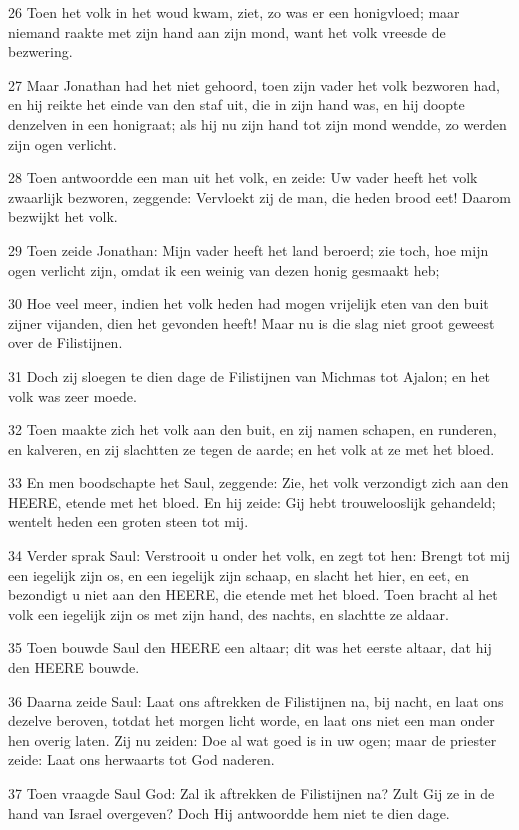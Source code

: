 \par 26 Toen het volk in het woud kwam, ziet, zo was er een honigvloed; maar niemand raakte met zijn hand aan zijn mond, want het volk vreesde de bezwering.
\par 27 Maar Jonathan had het niet gehoord, toen zijn vader het volk bezworen had, en hij reikte het einde van den staf uit, die in zijn hand was, en hij doopte denzelven in een honigraat; als hij nu zijn hand tot zijn mond wendde, zo werden zijn ogen verlicht.
\par 28 Toen antwoordde een man uit het volk, en zeide: Uw vader heeft het volk zwaarlijk bezworen, zeggende: Vervloekt zij de man, die heden brood eet! Daarom bezwijkt het volk.
\par 29 Toen zeide Jonathan: Mijn vader heeft het land beroerd; zie toch, hoe mijn ogen verlicht zijn, omdat ik een weinig van dezen honig gesmaakt heb;
\par 30 Hoe veel meer, indien het volk heden had mogen vrijelijk eten van den buit zijner vijanden, dien het gevonden heeft! Maar nu is die slag niet groot geweest over de Filistijnen.
\par 31 Doch zij sloegen te dien dage de Filistijnen van Michmas tot Ajalon; en het volk was zeer moede.
\par 32 Toen maakte zich het volk aan den buit, en zij namen schapen, en runderen, en kalveren, en zij slachtten ze tegen de aarde; en het volk at ze met het bloed.
\par 33 En men boodschapte het Saul, zeggende: Zie, het volk verzondigt zich aan den HEERE, etende met het bloed. En hij zeide: Gij hebt trouwelooslijk gehandeld; wentelt heden een groten steen tot mij.
\par 34 Verder sprak Saul: Verstrooit u onder het volk, en zegt tot hen: Brengt tot mij een iegelijk zijn os, en een iegelijk zijn schaap, en slacht het hier, en eet, en bezondigt u niet aan den HEERE, die etende met het bloed. Toen bracht al het volk een iegelijk zijn os met zijn hand, des nachts, en slachtte ze aldaar.
\par 35 Toen bouwde Saul den HEERE een altaar; dit was het eerste altaar, dat hij den HEERE bouwde.
\par 36 Daarna zeide Saul: Laat ons aftrekken de Filistijnen na, bij nacht, en laat ons dezelve beroven, totdat het morgen licht worde, en laat ons niet een man onder hen overig laten. Zij nu zeiden: Doe al wat goed is in uw ogen; maar de priester zeide: Laat ons herwaarts tot God naderen.
\par 37 Toen vraagde Saul God: Zal ik aftrekken de Filistijnen na? Zult Gij ze in de hand van Israel overgeven? Doch Hij antwoordde hem niet te dien dage.
